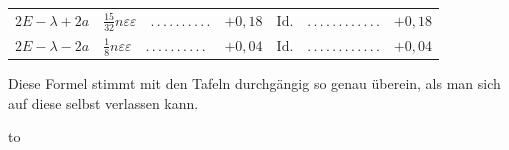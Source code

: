 \begin{landscape}
\begin{longtable}{r|p{7.8cm}r@{\quad}p{4.3cm}r}
\(2E-\lambda+2a\)&\(\tfrac{15}{32}n\varepsilon\varepsilon\quad \mathord{.}\,\mathord{.}\,\mathord{.}\,\mathord{.}\,\mathord{.}\,\mathord{.}\,\mathord{.}\,\mathord{.}\,\mathord{.}\,\mathord{.}\)&\(+0{,}18\)
&\(\text{Id.}\quad \mathord{.}\,\mathord{.}\,\mathord{.}\,\mathord{.}\,\mathord{.}\,\mathord{.}\,\mathord{.}\,\mathord{.}\,\mathord{.}\,\mathord{.}\,\mathord{.}\,\mathord{.}\)&\(+0{,}18\)\\
\(2E-\lambda-2a\)&\(\tfrac18n\varepsilon\varepsilon\quad \mathord{.}\,\mathord{.}\,\mathord{.}\,\mathord{.}\,\mathord{.}\,\mathord{.}\,\mathord{.}\,\mathord{.}\,\mathord{.}\,\mathord{.}\)&\(+0{,}04\)
&\(\text{Id.}\quad \mathord{.}\,\mathord{.}\,\mathord{.}\,\mathord{.}\,\mathord{.}\,\mathord{.}\,\mathord{.}\,\mathord{.}\,\mathord{.}\,\mathord{.}\,\mathord{.}\,\mathord{.}\)&\(+0{,}04\)
\end{longtable}
\endgroup
\par\vskip1pt\noindent\hspace*{\parindent}Diese Formel stimmt mit den Tafeln durchgängig so genau überein, als
man sich auf diese selbst verlassen kann.
\par\nobreak\kern2pt\nointerlineskip
\hbox to \linewidth{\hfil\rule{3cm}{.4pt}\hfil}
\end{landscape}
\endgroup
